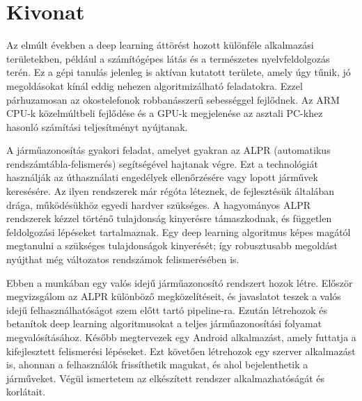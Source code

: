 \setcounter{page}{1}

\selecthungarian

\chapter*{Kivonat}

Az elmúlt években a deep learning áttörést hozott különféle alkalmazási területekben, például a számítógépes látás és a természetes nyelvfeldolgozás terén. Ez a gépi tanulás jelenleg is aktívan kutatott területe, amely úgy tűnik, jó megoldásokat kínál eddig nehezen algoritmizálható feladatokra. Ezzel párhuzamosan az okostelefonok robbanásszerű sebességgel fejlődnek. Az ARM CPU-k közelmúltbeli fejlődése és a GPU-k megjelenése az asztali PC-khez hasonló számítási teljesítményt nyújtanak.

A járműazonosítás gyakori feladat, amelyet gyakran az ALPR (automatikus rendszámtábla-felismerés) segítségével hajtanak végre. Ezt a technológiát használják az úthasználati engedélyek ellenőrzésére vagy lopott járművek keresésére. Az ilyen rendszerek már régóta léteznek, de fejlesztésük általában drága, működésükhöz egyedi hardver szükséges. A hagyományos ALPR rendszerek kézzel történő tulajdonság kinyerésre támaszkodnak, és független feldolgozási lépéseket tartalmaznak. Egy deep learning algoritmus képes magától megtanulni a szükséges tulajdonságok kinyerését; így robusztusabb megoldást nyújthat még változatos rendszámok felismerésében is.

Ebben a munkában egy valós idejű járműazonosító rendszert hozok létre. Először megvizsgálom az ALPR különböző megközelítéseit, és javaslatot teszek a valós idejű felhasználhatóságot szem előtt tartó pipeline-ra. Ezután létrehozok és betanítok deep learning algoritmusokat a teljes járműazonosítási folyamat megvalósításához. Később megtervezek egy Android alkalmazást, amely futtatja a kifejlesztett felismerési lépéseket. Ezt követően létrehozok egy szerver alkalmazást is, ahonnan a felhasználók frissíthetik magukat, és ahol bejelenthetik a járműveket. Végül ismertetem az elkészített rendszer alkalmazhatóságát és korlátait.


\vfill
\selectenglish


